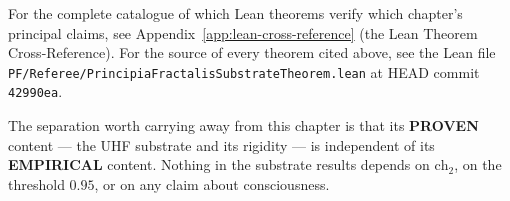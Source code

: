 \noindent For the complete catalogue of which Lean theorems
verify which chapter's principal claims, see
Appendix~\ref{app:lean-cross-reference} (the Lean Theorem
Cross-Reference). For the source of every theorem cited above,
see the Lean file
\texttt{PF/\allowbreak{}Referee/\allowbreak{}Principia\allowbreak{}Fractalis\allowbreak{}Substrate\allowbreak{}Theorem.\allowbreak{}lean} at
HEAD commit \texttt{42990ea}.


\noindent The separation worth carrying away from this chapter is that its
\textbf{PROVEN} content --- the UHF substrate and its rigidity --- is independent
of its \textbf{EMPIRICAL} content. Nothing in the substrate results depends on
$\text{ch}_2$, on the threshold $0.95$, or on any claim about consciousness.
